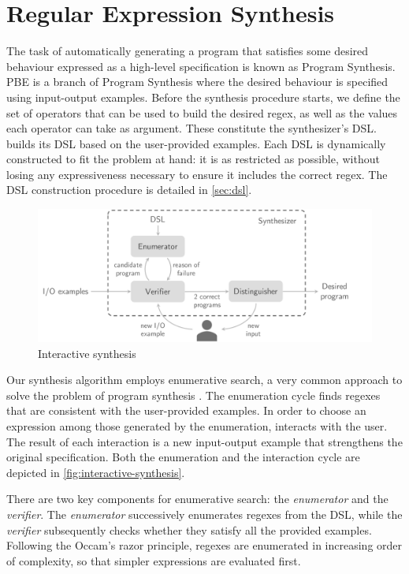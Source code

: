 \chapter{Regular Expression Synthesis}

The task of automatically generating a program that satisfies some desired behaviour expressed as a high-level specification is known as Program Synthesis. \acf{PBE} is a branch of Program Synthesis where the desired behaviour is specified using input-output examples. 
%
Before the synthesis procedure starts, we define the set of operators that can be used to build the desired regex, as well as the values each operator can take as argument. These constitute the synthesizer's \ac{DSL}. \Forest{} builds its DSL based on the user-provided examples. Each DSL is dynamically constructed to fit the problem at hand: it is as restricted as possible, without losing any expressiveness necessary to ensure it includes the correct regex. The DSL construction procedure is detailed in \autoref{sec:dsl}.

\begin{figure}
    \centering
    \includegraphics[width=.9\linewidth]{pictures/interactive_synthesis.pdf}
    \caption{Interactive synthesis}
    \label{fig:interactive-synthesis}
\end{figure}

Our synthesis algorithm employs enumerative search, a very common approach to solve the problem of program synthesis \cite{DBLP:conf/pldi/FengMBD18,DBLP:conf/pldi/FengMGDC17,AlphaRegex16,Orvalho19,DBLP:conf/cav/ReynoldsBNBT19}. The enumeration cycle finds regexes that are consistent with the user-provided examples. In order to choose an expression among those generated by the enumeration,  \Forest{} interacts with the user. The result of each interaction is a new input-output example that strengthens the original specification. Both the enumeration and the interaction cycle are depicted in \autoref{fig:interactive-synthesis}.

There are two key components for enumerative search: the \textit{enumerator} and the \textit{verifier}.
The \textit{enumerator} successively enumerates regexes from the DSL, while the \textit{verifier} subsequently checks whether they satisfy all the provided examples.
%
Following the Occam's razor principle, regexes are enumerated in increasing order of complexity, so that simpler expressions are evaluated first. %

